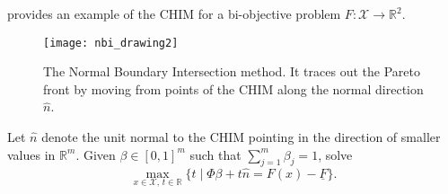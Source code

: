 \documentclass[main.tex]{subfiles}
\begin{document}
\begin{example}
   provides an example of the CHIM for a
  bi-objective problem $F:\mathcal{X}\to\mathbb{R}^2$.
  \begin{figure}[htbp]
    \centering
    \texttt{[image: nbi\_drawing2]}
    \caption[The Normal Boundary Intersection method]{The Normal Boundary Intersection method. It traces out the
      Pareto front by moving from points of the CHIM along the normal
      direction $\hat n$.}\label{fig:nbi_drawing2}
  \end{figure}
\end{example}

\begin{mydef}
  Let $\hat{n}$ denote the unit normal to the CHIM pointing in the
  direction of smaller values in $\mathbb{R}^m$.
  Given $\beta\in{[0,1]}^m$ such that
  $\sum_{j=1}^m\beta_j=1$, solve
  \begin{equation}
    \max_{x\in\mathcal{X},\,t\in\mathbb{R}} \{t \mid \Phi\beta +
    t\hat{n} = F(x) - \underline{F}\}.
  \end{equation}
\end{mydef}
\end{document}
